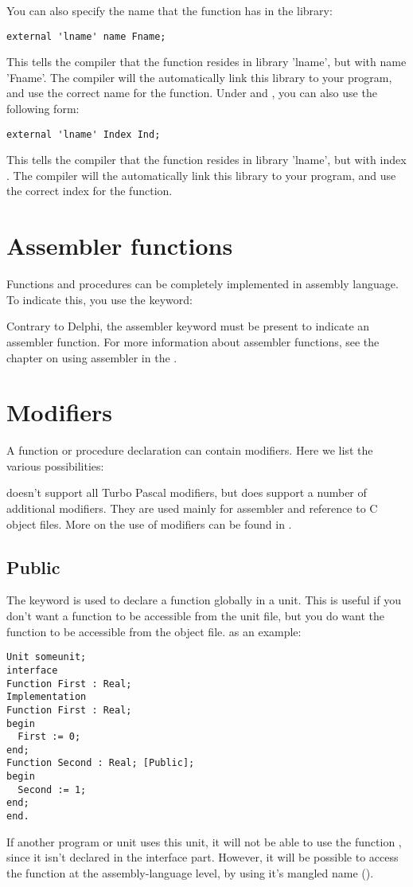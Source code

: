 \documentclass{report}
\begin{document}
You can also specify the name that the function has in the library:
\begin{verbatim}
external 'lname' name Fname;
\end{verbatim}
This tells the compiler that the function resides in library 'lname',
but with name 'Fname'. The compiler will the automatically link this
library to your program, and use the correct name for the function.
Under \windows and \ostwo, you can also use the following form:
\begin{verbatim}
external 'lname' Index Ind;
\end{verbatim}
This tells the compiler that the function resides in library 'lname',
but with index . The compiler will the automatically
link this library to your program, and use the correct index for the
function.
\section{Assembler functions}
Functions and procedures can be completely implemented in assembly
language. To indicate this, you use the  keyword:

Contrary to Delphi, the assembler keyword must be present to indicate an
assembler function.
For more information about assembler functions, see the chapter on using
assembler in the \progref.

\section{Modifiers}
A function or procedure declaration can contain modifiers. Here we list the
various possibilities:

\fpc doesn't support all Turbo Pascal modifiers, but
does support a number of additional modifiers. They are used mainly for assembler and
reference to C object files. More on the use of modifiers can be found in
\progref.
\subsection{Public}
The  keyword is used to declare a function globally in a unit.
This is useful if you don't want a function to be accessible from the unit
file, but you do want the function to be accessible from the object file.
as an example:
\begin{verbatim}
Unit someunit;
interface
Function First : Real;
Implementation
Function First : Real;
begin
  First := 0;
end;
Function Second : Real; [Public];
begin
  Second := 1;
end;
end.
\end{verbatim}
If another program or unit uses this unit, it will not be able to use the
function , since it isn't declared in the interface part.
However, it will be possible to access the function  at the
assembly-language level, by using it's mangled name (\progref).
\end{document}

